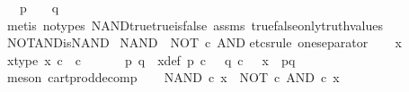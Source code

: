 \begin{isabellebody}
\ \ \ {\isachardoublequoteopen}p\ {\isacharequal}{\kern0pt}\ {\isasymf}\ {\isasymor}\ q\ {\isacharequal}{\kern0pt}\ {\isasymf}{\isachardoublequoteclose}\isanewline
%
\isadelimproof
\ \ %
\endisadelimproof
%
\isatagproof
{}\isamarkupfalse%
\ {\isacharparenleft}{\kern0pt}metis\ {\isacharparenleft}{\kern0pt}no{\isacharunderscore}{\kern0pt}types{\isacharparenright}{\kern0pt}\ NAND{\isacharunderscore}{\kern0pt}true{\isacharunderscore}{\kern0pt}true{\isacharunderscore}{\kern0pt}is{\isacharunderscore}{\kern0pt}false\ assms\ true{\isacharunderscore}{\kern0pt}false{\isacharunderscore}{\kern0pt}only{\isacharunderscore}{\kern0pt}truth{\isacharunderscore}{\kern0pt}values{\isacharparenright}{\kern0pt}%
\endisatagproof
{\isafoldproof}%
%
\isadelimproof
\isanewline
%
\endisadelimproof
\isanewline
{}\isamarkupfalse%
\ NOT{\isacharunderscore}{\kern0pt}AND{\isacharunderscore}{\kern0pt}is{\isacharunderscore}{\kern0pt}NAND{\isacharcolon}{\kern0pt}\isanewline
\ {\isachardoublequoteopen}NAND\ {\isacharequal}{\kern0pt}\ NOT\ {\isasymcirc}\isactrlsub c\ AND{\isachardoublequoteclose}\isanewline
%
\isadelimproof
%
\endisadelimproof
%
\isatagproof
{}\isamarkupfalse%
{\isacharparenleft}{\kern0pt}etcs{\isacharunderscore}{\kern0pt}rule\ one{\isacharunderscore}{\kern0pt}separator{\isacharparenright}{\kern0pt}\isanewline
\ \ \isamarkupfalse%
\ x\ \isanewline
\ \ \isamarkupfalse%
\ x{\isacharunderscore}{\kern0pt}type{\isacharcolon}{\kern0pt}\ {\isachardoublequoteopen}x\ {\isasymin}\isactrlsub c\ {\isasymOmega}\ {\isasymtimes}\isactrlsub c\ {\isasymOmega}{\isachardoublequoteclose}\isanewline
\ \ \isamarkupfalse%
\ \isamarkupfalse%
\ p\ q\ \ x{\isacharunderscore}{\kern0pt}def{\isacharcolon}{\kern0pt}\ {\isachardoublequoteopen}p\ {\isasymin}\isactrlsub c\ {\isasymOmega}\ {\isasymand}\ q\ {\isasymin}\isactrlsub c\ {\isasymOmega}\ {\isasymand}\ x\ {\isacharequal}{\kern0pt}\ {\isasymlangle}p{\isacharcomma}{\kern0pt}q{\isasymrangle}{\isachardoublequoteclose}\isanewline
\ \ \ \ \isamarkupfalse%
\ {\isacharparenleft}{\kern0pt}meson\ cart{\isacharunderscore}{\kern0pt}prod{\isacharunderscore}{\kern0pt}decomp{\isacharparenright}{\kern0pt}\isanewline
\ \ \isamarkupfalse%
\ {\isachardoublequoteopen}NAND\ {\isasymcirc}\isactrlsub c\ x\ {\isacharequal}{\kern0pt}\ {\isacharparenleft}{\kern0pt}NOT\ {\isasymcirc}\isactrlsub c\ AND{\isacharparenright}{\kern0pt}\ {\isasymcirc}\isactrlsub c\ x{\isachardoublequoteclose}\isanewline

\end{isabellebody}
